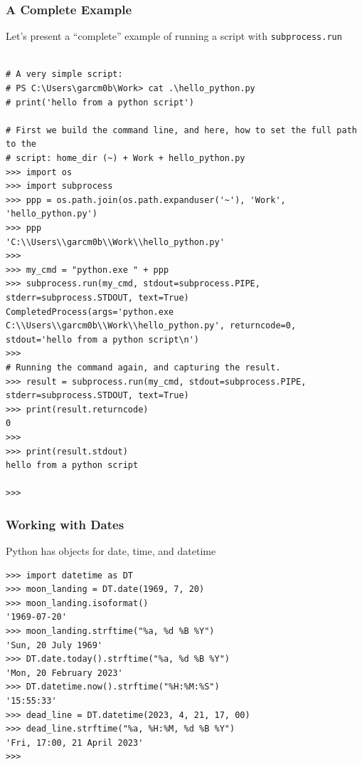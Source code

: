 \documentclass[aspectratio=169]{beamer}
\begin{document}
\begin{frame}[fragile]
\frametitle{A Complete Example}
Let's present a ``complete'' example of running a script with \texttt{subprocess.run}

\tiny
\begin{verbatim}

# A very simple script:
# PS C:\Users\garcm0b\Work> cat .\hello_python.py
# print('hello from a python script')

# First we build the command line, and here, how to set the full path to the
# script: home_dir (~) + Work + hello_python.py
>>> import os
>>> import subprocess
>>> ppp = os.path.join(os.path.expanduser('~'), 'Work', 'hello_python.py')
>>> ppp
'C:\\Users\\garcm0b\\Work\\hello_python.py'
>>>
>>> my_cmd = "python.exe " + ppp
>>> subprocess.run(my_cmd, stdout=subprocess.PIPE, stderr=subprocess.STDOUT, text=True)
CompletedProcess(args='python.exe C:\\Users\\garcm0b\\Work\\hello_python.py', returncode=0, stdout='hello from a python script\n')
>>>
# Running the command again, and capturing the result.
>>> result = subprocess.run(my_cmd, stdout=subprocess.PIPE, stderr=subprocess.STDOUT, text=True)
>>> print(result.returncode)
0
>>>
>>> print(result.stdout)
hello from a python script

>>>
\end{verbatim}
\normalsize

\end{frame}


\begin{frame}[fragile]
\frametitle{Working with Dates}

Python has objects for date, time, and datetime

\scriptsize
\begin{verbatim}
>>> import datetime as DT
>>> moon_landing = DT.date(1969, 7, 20)
>>> moon_landing.isoformat()
'1969-07-20'
>>> moon_landing.strftime("%a, %d %B %Y")
'Sun, 20 July 1969'
>>> DT.date.today().strftime("%a, %d %B %Y")
'Mon, 20 February 2023'
>>> DT.datetime.now().strftime("%H:%M:%S")
'15:55:33'
>>> dead_line = DT.datetime(2023, 4, 21, 17, 00)
>>> dead_line.strftime("%a, %H:%M, %d %B %Y")
'Fri, 17:00, 21 April 2023'
>>>

\end{verbatim}

\end{frame}
\end{document}
